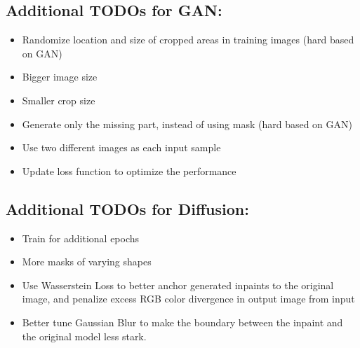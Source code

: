 \documentclass[sigconf]{acmart}
\begin{document}
\subsection*{Additional TODOs for GAN:}
\begin{itemize}
    \item Randomize location and size of cropped areas in training images (hard based on GAN)
    \item Bigger image size
    \item Smaller crop size
    \item Generate only the missing part, instead of using mask (hard based on GAN)
    \item Use two different images as each input sample
    \item Update loss function to optimize the performance
\end{itemize}

\subsection*{Additional TODOs for Diffusion:}
\begin{itemize}
    \item Train for additional epochs
    \item More masks of varying shapes
    \item Use Wasserstein Loss to better anchor generated inpaints to the original image, and penalize excess RGB color divergence in output image from input
    \item Better tune Gaussian Blur to make the boundary between the inpaint and the original model less stark.
\end{itemize}
\end{document}
